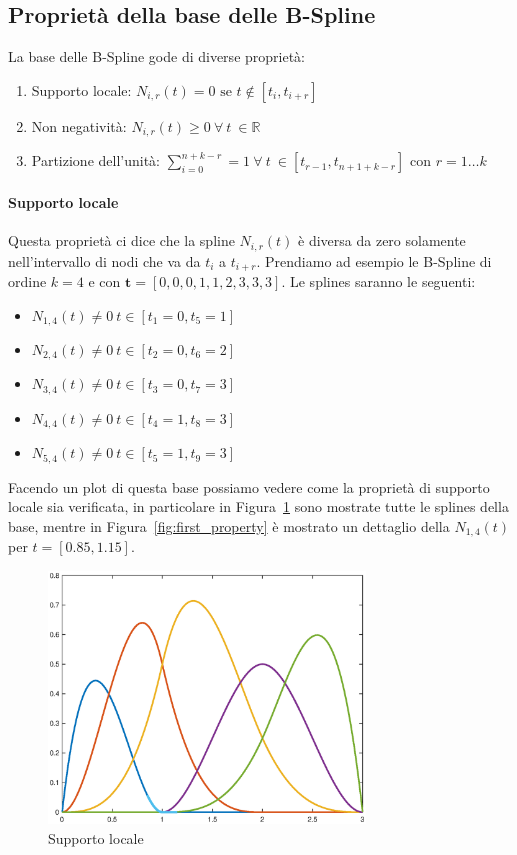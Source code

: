 \documentclass[a4paper, 10pt]{article}
\begin{document}
\subsection{Proprietà della base delle B-Spline}
La base delle B-Spline gode di diverse proprietà:
\begin{enumerate}
  \item Supporto locale: $N_{i, r}(t) = 0 \text{ se } t \notin [t_i, t_{i+r}]$
  \item Non negatività: $N_{i, r}(t) \geq 0\ \forall \ t \ \in \mathbb{R}$
  \item Partizione dell'unità: $\sum_{i = 0}^{n+k-r} = 1 \ \forall \  t \ \in [t_{r-1}, t_{n+1+k-r}] \text{ con } r = 1 \dots k$
\end{enumerate}
\paragraph{Supporto locale}
Questa proprietà ci dice che la spline $N_{i, r}(t)$ è diversa da zero solamente nell'intervallo di nodi che va 
da $t_i$ a $t_{i+r}$. Prendiamo ad esempio le B-Spline di ordine $k = 4$ e 
con $\mathbf{t} = [0, 0, 0, 1, 1, 2, 3, 3, 3]$. Le splines saranno le seguenti:
\begin{itemize}
  \item $N_{1, 4}(t)\neq 0\ t \in [t_1 = 0, t_5 = 1]$
  \item $N_{2, 4}(t)\neq 0\ t \in [t_2 = 0, t_6 = 2]$
  \item $N_{3, 4}(t)\neq 0\ t \in [t_3 = 0, t_7 = 3]$
  \item $N_{4, 4}(t)\neq 0\ t \in [t_4 = 1, t_8 = 3]$
  \item $N_{5, 4}(t)\neq 0\ t \in [t_5 = 1, t_9 = 3]$
\end{itemize}
Facendo un plot di questa base possiamo vedere come la proprietà di supporto locale sia verificata, in particolare in Figura~\ref{fig:local_support} sono mostrate
tutte le splines della base, mentre in Figura~\ref{fig:first_property} è mostrato un dettaglio della $N_{1, 4}(t)$ per $t = [0.85, 1.15]$.
\begin{figure}[]
  \centering
  \includegraphics[width=0.75\textwidth]{figure/local_support.eps}
  \caption{Supporto locale}
  \label{fig:local_support}
\end{figure} 
\end{document}
